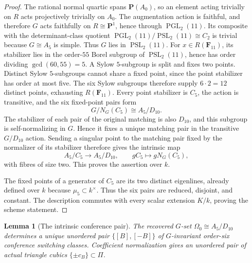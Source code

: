 \documentclass[11pt]{article}
\newtheorem{lemma}[theorem]{Lemma}
\theoremstyle{definition}
\theoremstyle{remark}
\newcommand{\F}{\mathbf F}
\newcommand{\PP}{\mathbf P}
\newcommand{\PGL}{\operatorname{PGL}}
\begin{document}
\begin{proof}
The rational normal quartic spans \(\PP(A_0)\), so an element acting trivially
on \(R\) acts projectively trivially on \(A_0\).  The augmentation action is
faithful, and therefore \(G\) acts faithfully on \(R\cong\PP^1\), hence through
\(\PGL_2(11)\).  Its composite with the determinant-class quotient
\(\PGL_2(11)/\operatorname{PSL}_2(11)\cong C_2\) is trivial because
\(G\cong A_5\) is simple.  Thus \(G\) lies in
\(\operatorname{PSL}_2(11)\).  For \(x\in R(\F_{11})\), its
stabilizer lies in the
order-\(55\) Borel subgroup of \(\operatorname{PSL}_2(11)\), hence has order
dividing \(\gcd(60,55)=5\).  A Sylow \(5\)-subgroup is split and fixes two
points.  Distinct Sylow \(5\)-subgroups cannot share a fixed point, since
the point stabilizer has order at most five.  The six Sylow subgroups
therefore supply \(6\cdot2=12\) distinct points, exhausting \(R(\F_{11})\).
Every point stabilizer is \(C_5\), the action is transitive, and the six
fixed-point pairs form
\[
 G/N_G(C_5)\cong A_5/D_{10}.
\]
The stabilizer of each pair of the original matching is also \(D_{10}\), and
this subgroup is self-normalizing in \(G\).  Hence it fixes a unique matching
pair in the transitive \(G/D_{10}\) action.  Sending a singular point
to the matching pair fixed by the normalizer of its stabilizer therefore
gives the intrinsic map
\[
 A_5/C_5\longrightarrow A_5/D_{10},
 \qquad gC_5\longmapsto gN_G(C_5),
\]
with fibres of size two.  This proves the assertion over \(k\).

The fixed points of a generator of \(C_5\) are its two distinct eigenlines,
already defined over \(k\) because \(\mu_5\subset k^\times\).  Thus the six
pairs are reduced, disjoint, and constant.  The description commutes with
every scalar extension \(K/k\), proving the scheme statement.
\end{proof}

\begin{lemma}[The intrinsic conference pair]
\label{lem:conference-pair}
The recovered \(G\)-set \(\Omega_0\cong A_5/D_{10}\) determines a unique
unordered pair \(\{[B],[-B]\}\) of \(G\)-invariant order-six conference
switching classes.  Coefficient normalization gives an unordered pair of
actual triangle cubics \(\{\pm c_B\}\subset\Pi\).
\end{lemma}
\end{document}
